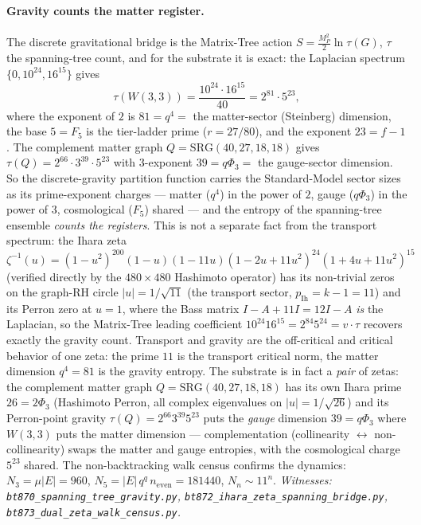 \documentclass[11pt]{article}
\newcommand{\W}{W(3,3)}
\begin{document}
\paragraph{Gravity counts the matter register.}  The discrete
gravitational bridge is the Matrix-Tree action
$S=\tfrac{M_P^2}{2}\ln\tau(G)$, $\tau$ the spanning-tree count, and
for the substrate it is exact: the Laplacian spectrum
$\{0,10^{24},16^{15}\}$ gives
\[
\tau(\W)=\frac{10^{24}\cdot16^{15}}{40}=2^{81}\cdot5^{23},
\]
where the exponent of $2$ is $81=q^4=$ the matter-sector (Steinberg)
dimension, the base $5=F_5$ is the tier-ladder prime ($r=27/80$), and
the exponent $23=f-1$.  The complement matter graph
$Q=\mathrm{SRG}(40,27,18,18)$ gives
$\tau(Q)=2^{66}\cdot3^{39}\cdot5^{23}$ with $3$-exponent
$39=q\Phi_3=$ the gauge-sector dimension.  So the discrete-gravity
partition function carries the Standard-Model sector sizes as its
prime-exponent charges --- matter ($q^4$) in the power of $2$, gauge
($q\Phi_3$) in the power of $3$, cosmological ($F_5$) shared --- and
the entropy of the spanning-tree ensemble \emph{counts the
registers}.  This is not a separate fact from the transport
spectrum: the Ihara zeta
$\zeta^{-1}(u)=(1-u^2)^{200}(1-u)(1-11u)(1-2u+11u^2)^{24}(1+4u+11u^2)^{15}$
(verified directly by the $480\times480$ Hashimoto operator) has its
non-trivial zeros on the graph-RH circle $|u|=1/\sqrt{11}$ (the
transport sector, $p_{\mathrm{Ih}}=k-1=11$) and its Perron zero at
$u=1$, where the Bass matrix $I-A+11I=12I-A$ \emph{is} the Laplacian,
so the Matrix-Tree leading coefficient $10^{24}16^{15}=2^{84}5^{24}
=v\cdot\tau$ recovers exactly the gravity count.  Transport and
gravity are the off-critical and critical behavior of one zeta:
the prime $11$ is the transport critical norm, the matter dimension
$q^4=81$ is the gravity entropy.  The substrate is in fact a
\emph{pair} of zetas: the complement matter graph
$Q=\mathrm{SRG}(40,27,18,18)$ has its own Ihara prime $26=2\Phi_3$
(Hashimoto Perron, all complex eigenvalues on $|u|=1/\sqrt{26}$) and
its Perron-point gravity $\tau(Q)=2^{66}3^{39}5^{23}$ puts the
\emph{gauge} dimension $39=q\Phi_3$ where $\W$ puts the matter
dimension --- complementation (collinearity $\leftrightarrow$
non-collinearity) swaps the matter and gauge entropies, with the
cosmological charge $5^{23}$ shared.  The non-backtracking walk
census confirms the dynamics: $N_3=\mu|E|=960$,
$N_5=|E|\,q^q\,n_{\mathrm{even}}=181440$, $N_n\sim11^n$.
\emph{Witnesses: \texttt{bt870\_spanning\_tree\_gravity.py},
\texttt{bt872\_ihara\_zeta\_spanning\_bridge.py},
\texttt{bt873\_dual\_zeta\_walk\_census.py}.}
\end{document}
